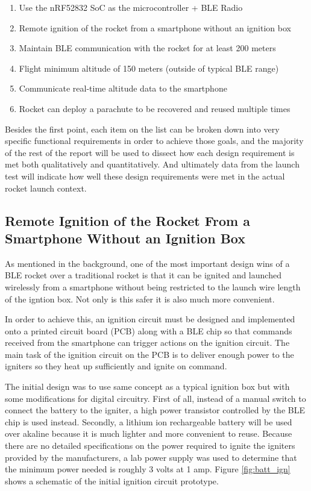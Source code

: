 \documentclass{workreport}
\begin{document}
\begin{body}
	\begin{enumerate}
	\item Use the nRF52832 SoC as the microcontroller + BLE Radio
  \item Remote ignition of the rocket from a smartphone without an ignition box
	\item Maintain BLE communication with the rocket for at least 200 meters
	\item Flight minimum altitude of 150 meters (outside of typical BLE range)
	\item Communicate real-time altitude data to the smartphone
	\item Rocket can deploy a parachute to be recovered and reused multiple times
	\end{enumerate}

	Besides the first point, each item on the list can be broken down into very specific functional requirements in order to achieve those goals, and the majority of the rest of the report will be used to dissect how each design requirement is met both qualitatively and quantitatively. And ultimately data from the launch test will indicate how well these design requirements were met in the actual rocket launch context.

	\subsection{Remote Ignition of the Rocket From a Smartphone Without an Ignition Box}
	As mentioned in the background, one of the most important design wins of a BLE rocket over a traditional rocket is that it can be ignited and launched wirelessly from a smartphone without being restricted to the launch wire length of the igntion box. Not only is this safer it is also much more convenient.

	In order to achieve this, an ignition circuit must be designed and implemented onto a printed circuit board (PCB) along with a BLE chip so that commands received from the smartphone can trigger actions on the ignition circuit. The main task of the ignition circuit on the PCB is to deliver enough power to the igniters so they heat up sufficiently and ignite on command.

	The initial design was to use same concept as a typical ignition box but with some modifications for digital circuitry. First of all, instead of a manual switch to connect the battery to the igniter, a high power transistor controlled by the BLE chip is used instead. Secondly, a lithium ion rechargeable battery will be used over akaline because it is much lighter and more convenient to reuse. Because there are no detailed specifications on the power required to ignite the igniters provided by the manufacturers, a lab power supply was used to determine that the minimum power needed is roughly 3 volts at 1 amp. Figure \ref{fig:batt_ign} shows a schematic of the initial ignition circuit prototype.


\end{body}
\end{document}
